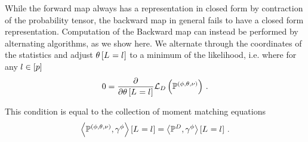 \label{sec:alternatingBackwardMap}

While the forward map always has a representation in closed form by contraction of the probability tensor, the backward map in general fails to have a closed form representation.
Computation of the Backward map can instead be performed by alternating algorithms, as we show here. %
We alternate through the coordinates of the statistics and adjust $\theta\left[L_{}=l_{}\right]$ to a minimum of the likelihood, i.e. where for any $l\in[p]$
\begin{align*}
    0 = \frac{\partial}{\partial \theta\left[L_{}=l_{}\right]} \mathcal{L}_{D}\left(\mathbb{P}^{(\phi,\theta,\nu)}\right) \, .
\end{align*}

This condition is equal to the collection of moment matching equations %
\begin{align*}
    \left\langle \mathbb{P}^{(\phi,\theta,\nu)},\gamma^{\phi}\right\rangle \left[ L_{}=l_{} \right] = \left\langle \mathbb{P}^{D},\gamma^{\phi}\right\rangle \left[ L_{}=l_{} \right] \, .
\end{align*}


